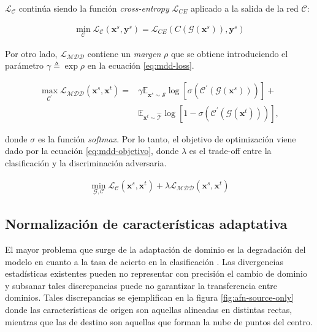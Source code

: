 $\mathcal{L}_{\mathcal{C}}$ continúa siendo la función {\it cross-entropy} $\mathcal{L}_{CE}$ aplicado a la salida de la red $\mathcal{C}$:

\begin{align}
  \min_{\mathcal{C}} \mathcal{L}_\mathcal{C}(\mathbf{x}^s, \mathbf{y}^s) = \mathcal{L}_{CE}(C(\mathcal{G}(\mathbf{x}^s)), \mathbf{y}^s)
  \label{eq:mdd-loss-clasificadora}
\end{align}

Por otro lado, $\mathcal{L}_{\mathcal{MDD}}$ contiene un {\it margen} $\rho$ que se obtiene introduciendo el parámetro
$\gamma \triangleq \exp \rho$ en la ecuación \ref{eq:mdd-loss}.

\begin{align}
  \max_{\mathcal{C}^{'}} \mathcal{L}_{\mathcal{MDD}}(\mathbf{x}^s, \mathbf{x}^t) = & \gamma \mathbb{E}_{\mathbf{x}^s \sim \mathcal{\hat{S}}} \log[\sigma(\mathcal{C}^{'}(\mathcal{G}(\mathbf{x}^s)))] + \nonumber \\
                                                                                   & \mathbb{E}_{\mathbf{x}^t \sim \mathcal{\hat{T}}} \log[1-\sigma(\mathcal{C}^{'}(\mathcal{G}(\mathbf{x}^t)))],
  \label{eq:mdd-loss}
\end{align}

\noindent
donde $\sigma$ es la función {\it softmax}. Por lo tanto, el objetivo de optimización viene dado por la ecuación
\ref{eq:mdd-objetivo}, donde $\lambda$ es el trade-off entre la clasificación y la discriminación adversaria.

\begin{align}
  \min_{\mathcal{G}, \mathcal{C}} \mathcal{L}_{\mathcal{C}}(\mathbf{x}^s, \mathbf{x}^t) + \lambda \mathcal{L}_{\mathcal{MDD}}(\mathbf{x}^s, \mathbf{x}^t)
  \label{eq:mdd-objetivo}
\end{align}

\subsection{Normalización de características adaptativa}

El mayor problema que surge de la adaptación de dominio es la degradación del modelo en cuanto a la tasa de acierto en
la clasificación \parencite{yosinski2014transferable}. Las divergencias estadísticas existentes pueden no representar con precisión el
cambio de dominio y subsanar tales discrepancias puede no garantizar la transferencia entre dominios. Tales
discrepancias se ejemplifican en la figura \ref{fig:afn-source-only} donde las características de origen son aquellas
alineadas en distintas rectas, mientras que las de destino son aquellas que forman la nube de puntos del centro.

